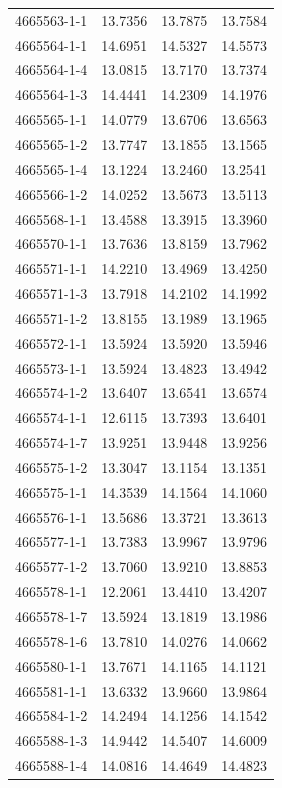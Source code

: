 \begin{longtable}{lrrr}
4665563-1-1 & 13.7356 & 13.7875 & 13.7584 \\
4665564-1-1 & 14.6951 & 14.5327 & 14.5573 \\
4665564-1-4 & 13.0815 & 13.7170 & 13.7374 \\
4665564-1-3 & 14.4441 & 14.2309 & 14.1976 \\
4665565-1-1 & 14.0779 & 13.6706 & 13.6563 \\
4665565-1-2 & 13.7747 & 13.1855 & 13.1565 \\
4665565-1-4 & 13.1224 & 13.2460 & 13.2541 \\
4665566-1-2 & 14.0252 & 13.5673 & 13.5113 \\
4665568-1-1 & 13.4588 & 13.3915 & 13.3960 \\
4665570-1-1 & 13.7636 & 13.8159 & 13.7962 \\
4665571-1-1 & 14.2210 & 13.4969 & 13.4250 \\
4665571-1-3 & 13.7918 & 14.2102 & 14.1992 \\
4665571-1-2 & 13.8155 & 13.1989 & 13.1965 \\
4665572-1-1 & 13.5924 & 13.5920 & 13.5946 \\
4665573-1-1 & 13.5924 & 13.4823 & 13.4942 \\
4665574-1-2 & 13.6407 & 13.6541 & 13.6574 \\
4665574-1-1 & 12.6115 & 13.7393 & 13.6401 \\
4665574-1-7 & 13.9251 & 13.9448 & 13.9256 \\
4665575-1-2 & 13.3047 & 13.1154 & 13.1351 \\
4665575-1-1 & 14.3539 & 14.1564 & 14.1060 \\
4665576-1-1 & 13.5686 & 13.3721 & 13.3613 \\
4665577-1-1 & 13.7383 & 13.9967 & 13.9796 \\
4665577-1-2 & 13.7060 & 13.9210 & 13.8853 \\
4665578-1-1 & 12.2061 & 13.4410 & 13.4207 \\
4665578-1-7 & 13.5924 & 13.1819 & 13.1986 \\
4665578-1-6 & 13.7810 & 14.0276 & 14.0662 \\
4665580-1-1 & 13.7671 & 14.1165 & 14.1121 \\
4665581-1-1 & 13.6332 & 13.9660 & 13.9864 \\
4665584-1-2 & 14.2494 & 14.1256 & 14.1542 \\
4665588-1-3 & 14.9442 & 14.5407 & 14.6009 \\
4665588-1-4 & 14.0816 & 14.4649 & 14.4823 \\

\end{longtable}
